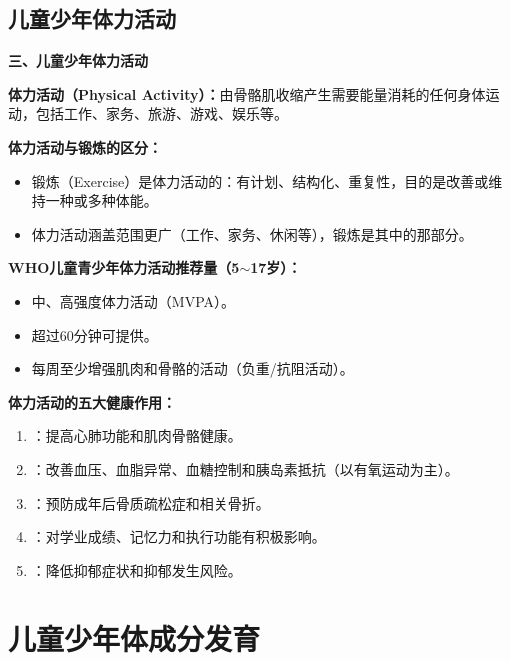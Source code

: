 \subsection{儿童少年体力活动}

\begin{keybox}
\textbf{三、儿童少年体力活动}

\textbf{体力活动（Physical Activity）：}由骨骼肌收缩产生需要能量消耗的任何身体运动，包括工作、家务、旅游、游戏、娱乐等。

\textbf{体力活动与锻炼的区分：}
\begin{itemize}[leftmargin=*]
    \item 锻炼（Exercise）是体力活动的：有计划、结构化、重复性，目的是改善或维持一种或多种体能。
    \item 体力活动涵盖范围更广（工作、家务、休闲等），锻炼是其中的那部分。
\end{itemize}

\textbf{WHO儿童青少年体力活动推荐量（5$\sim$17岁）：}
\begin{itemize}[leftmargin=*]
    \item {}中、高强度体力活动（MVPA）。
    \item 超过60分钟可提供。
    \item 每周至少增强肌肉和骨骼的活动（负重/抗阻活动）。
\end{itemize}

\textbf{体力活动的五大健康作用：}
\begin{enumerate}[leftmargin=*]
    \item {}：提高心肺功能和肌肉骨骼健康。
    \item {}：改善血压、血脂异常、血糖控制和胰岛素抵抗（以有氧运动为主）。
    \item {}：预防成年后骨质疏松症和相关骨折。
    \item {}：对学业成绩、记忆力和执行功能有积极影响。
    \item {}：降低抑郁症状和抑郁发生风险。
\end{enumerate}
\end{keybox}

\section{儿童少年体成分发育}

